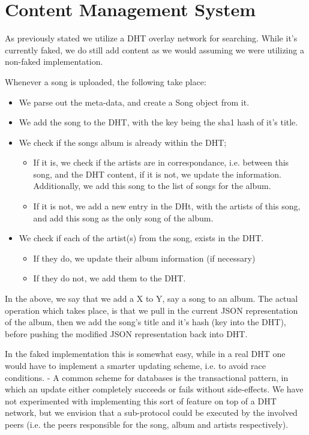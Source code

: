 \section{Content Management System}
As previously stated we utilize a DHT overlay network for searching. While it's
currently faked, we do still add content as we would assuming we were utilizing
a non-faked implementation.

Whenever a song is uploaded, the following take place:
\begin{itemize}
\item We parse out the meta-data, and create a Song object from it.
\item We add the song to the DHT, with the key being the sha1 hash of it's title.
\item We check if the songs album is already within the DHT;
\begin{itemize}
\item If it is, we check if the artists are in correspondance, i.e. between
    this song, and the DHT content, if it is not, we update the information.
    Additionally, we add this song to the list of songs for the album.
\item If it is not, we add a new entry in the DHt, with the artists of this
    song, and add this song as the only song of the album.
\end{itemize}
\item We check if each of the artist(s) from the song, exists in the DHT.
\begin{itemize}
\item If they do, we update their album information (if necessary)
\item If they do not, we add them to the DHT.
\end{itemize}
\end{itemize}
In the above, we say that we add a X to Y, say a song to an album. The actual 
operation which takes place, is that we pull in the current JSON representation
of the album, then we add the song's title and it's hash (key into the DHT),
before pushing the modified JSON representation back into DHT.

In the faked implementation this is somewhat easy, while in a real DHT one
would have to implement a smarter updating scheme, i.e. to avoid race conditions.
\newline
- A common scheme for databases is the transactional pattern, in which an update
either completely succeeds or fails without side-effects. We have not experimented
with implementing this sort of feature on top of a DHT network, but we envision
that a sub-protocol could be executed by the involved peers (i.e. the peers
responsible for the song, album and artists respectively).

